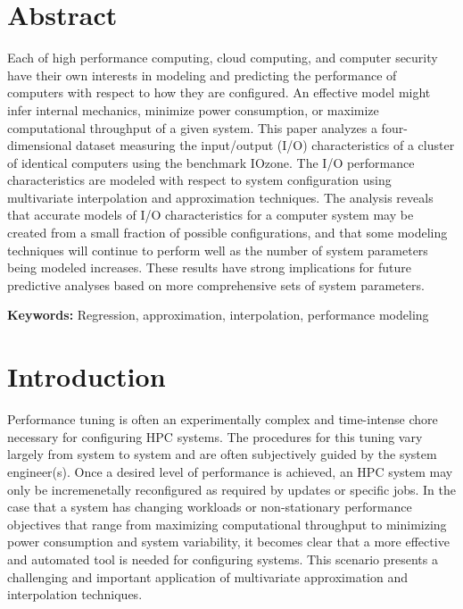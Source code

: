 \documentclass{scspaperproc}
\theoremstyle{scsthe}
\begin{document}
\maketitle

\section*{Abstract}

Each of high performance computing, cloud computing, and computer
security have their own interests in modeling and predicting the
performance of computers with respect to how they are configured. An
effective model might infer internal mechanics, minimize power
consumption, or maximize computational throughput of a given
system. This paper analyzes a four-dimensional dataset measuring the
input/output (I/O) characteristics of a cluster of identical computers
using the benchmark IOzone. The I/O performance characteristics are
modeled with respect to system configuration using multivariate
interpolation and approximation techniques. The analysis reveals that
accurate models of I/O characteristics for a computer system may be
created from a small fraction of possible configurations, and that
some modeling techniques will continue to perform well as the number
of system parameters being modeled increases. These results have
strong implications for future predictive analyses based on more
comprehensive sets of system parameters.

\textbf{Keywords:} Regression, approximation, interpolation,
performance modeling


\section{Introduction}

Performance tuning is often an experimentally complex and time-intense
chore necessary for configuring HPC systems. The procedures for this
tuning vary largely from system to system and are often subjectively
guided by the system engineer(s). Once a desired level of performance
is achieved, an HPC system may only be incremenetally reconfigured as
required by updates or specific jobs. In the case that a system has
changing workloads or non-stationary performance objectives that range
from maximizing computational throughput to minimizing power
consumption and system variability, it becomes clear that a more
effective and automated tool is needed for configuring systems. This
scenario presents a challenging and important application of
multivariate approximation and interpolation techniques.
\end{document}
